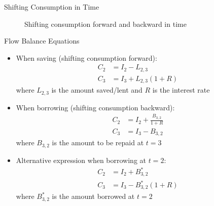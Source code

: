 \documentclass[10pt,handout]{beamer}
\begin{document}
\begin{frame}{Shifting Consumption in Time}
\begin{figure}
  \caption{Shifting consumption forward and backward in time}
\end{figure}
\end{frame}

\begin{frame}{Flow Balance Equations}
  \begin{itemize}[<+->]
    \item When saving (shifting consumption forward):
      \begin{align*}
        C_2 &= I_2 - L_{2,3} \\
        C_3 &= I_3 + L_{2,3}(1 + R)
      \end{align*}
      where $L_{2,3}$ is the amount saved/lent and $R$ is the interest rate
    \item When borrowing (shifting consumption backward):
      \begin{align*}
        C_2 &= I_2 + \tfrac{B_{3,2}}{1 + R} \\
        C_3 &= I_3 - B_{3,2}
      \end{align*}
      where $B_{3,2}$ is the amount to be repaid at $t=3$
    \item Alternative expression when borrowing at $t=2$:
      \begin{align*}
        C_2 &= I_2 + B^*_{3,2} \\
        C_3 &= I_3 - B^*_{3,2}(1 + R)
      \end{align*}
      where $B^*_{3,2}$ is the amount borrowed at $t=2$
  \end{itemize}
\end{frame}
\end{document}
